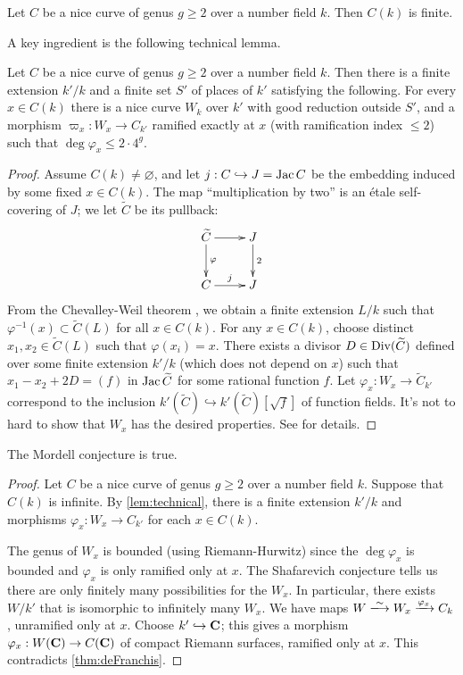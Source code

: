 \begin{conjecture}[Mordell]
Let $C$ be a nice curve of genus $g\geqslant 2$ over a number field $k$. Then 
$C(k)$ is finite. 
\end{conjecture}

A key ingredient is the following technical lemma. 

\begin{lemma}\label{lem:technical}
Let $C$ be a nice curve of genus $g\geqslant 2$ over a number field $k$. Then 
there is a finite extension $k'/k$ and a finite set $S'$ of places of $k'$ 
satisfying the following. For every $x\in C(k)$ there is a nice curve $W_k$ 
over $k'$ with good reduction outside $S'$, and a morphism 
$\varpi_x:W_x \to C_{k'}$ ramified exactly at $x$ (with ramification index 
$\leqslant 2$) such that $\deg\varphi_x \leqslant 2\cdot 4^g$. 
\end{lemma}
\begin{proof}
Assume $C(k)\ne\varnothing$, and let $j:C\hookrightarrow J=\operatorname{Jac} C$ be the 
embedding induced by some fixed $x\in C(k)$. The map ``multiplication by two'' 
is an \'etale self-covering of $J$; we let $\widetilde C$ be its pullback: 
\[\xymatrix{
  \widetilde C \ar[r] \ar[d]^-\varphi 
    & J \ar[d]^-2 \\
  C \ar[r]^-j 
    & J 
}\]
From the Chevalley-Weil theorem \cite[10.3.11]{bg06}, we obtain a finite 
extension $L/k$ such that $\varphi^{-1}(x)\subset \widetilde C(L)$ for all 
$x\in C(k)$. For any $x\in C(k)$, choose distinct $x_1,x_2\in \widetilde C(L)$ 
such that $\varphi(x_i) = x$. There exists a divisor 
$D\in \operatorname{Div}(\widetilde C)$ defined over some finite extension $k'/k$ (which 
does not depend on $x$) such that $x_1-x_2 + 2 D=(f)$ in $\operatorname{Jac}{\widetilde C}$ 
for some rational function $f$. Let 
$\varphi_x:W_x \to \widetilde C_{k'}$ correspond to the inclusion 
$k'(\widetilde C)\hookrightarrow k'(\widetilde C)[\sqrt f]$ of function 
fields. It's not to hard to show that $W_x$ has the desired properties. See 
\cite[IV.2.1]{la91} for details. 
\end{proof}

\begin{theorem}
The Mordell conjecture is true. 
\end{theorem}
\begin{proof}
Let $C$ be a nice curve of genus $g\geqslant 2$ over a number field $k$. 
Suppose that $C(k)$ is infinite. By \autoref{lem:technical}, there is a 
finite extension $k'/k$ and morphisms $\varphi_x:W_x \to C_{k'}$ for each 
$x\in C(k)$. 

The genus of $W_x$ is bounded (using Riemann-Hurwitz) since the 
$\deg\varphi_x$ is bounded and $\varphi_x$ is only ramified only at $x$. 
The Shafarevich conjecture tells us there are only finitely many possibilities 
for the $W_x$. In particular, there exists $W/k'$ that is isomorphic to 
infinitely many $W_x$. We have maps 
$W\isomorphism W_x \xrightarrow{\varphi_x} C_k$, unramified only at $x$. 
Choose $k'\hookrightarrow\mathbf{C}$; this gives a morphism 
$\varphi_x:W(\mathbf{C}) \to C(\mathbf{C})$ of compact Riemann surfaces, ramified only at 
$x$. This contradicts \autoref{thm:deFranchis}.
\end{proof}

